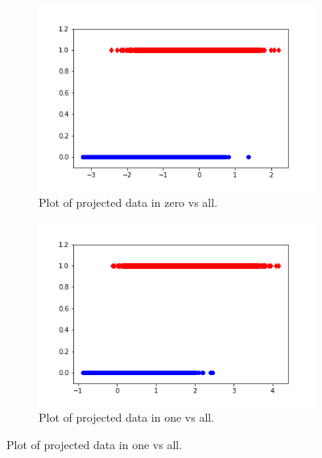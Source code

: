 \documentclass[12pt]{article}%
\numberwithin{equation}{subsection}
\begin{document}
\begin{figure}[H]
    \begin{subfigure}[b]{0.5\linewidth}
        \centering
        \includegraphics[width=\linewidth]{images/fig0.png}
        \caption{Plot of projected data in zero vs all.}
        \label{fig2:a}
        \vspace{4ex}
    \end{subfigure}%
    \begin{subfigure}[b]{0.5\linewidth}
        \centering
        \includegraphics[width=\linewidth]{images/fig1.png}
        \caption{Plot of projected data in one vs all.}
        \label{fig2:a}
        \vspace{4ex}
    \end{subfigure}%
    



\end{figure}
\end{document}
